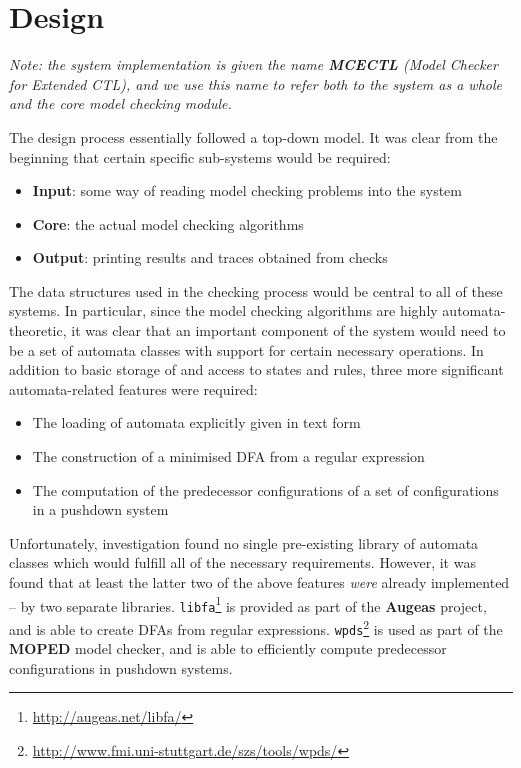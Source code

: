\documentclass[11pt]{article}
\theoremstyle{definition}
\begin{document}
\section{Design}

\textit{Note: the system implementation is given the name \textbf{MCECTL} (Model Checker for
Extended CTL), and we use this name to refer both to the system as a whole and
the core model checking module.}

The design process essentially followed a top-down model. It was clear from the beginning that certain specific sub-systems would be required:
\begin{itemize}
\item{\textbf{Input}: some way of reading model checking problems into the system}
\item{\textbf{Core}:  the actual model checking algorithms}
\item{\textbf{Output}: printing results and traces obtained from checks}
\end{itemize}

The data structures used in the checking process would be central to all of
these systems.  In particular, since the model checking algorithms are highly
automata-theoretic, it was clear that an important component of the system
would need to be a set of automata classes with support for certain necessary
operations. In addition to basic storage of and access to states and rules,
three more significant automata-related features were required:

\begin{itemize}
\item{The loading of automata explicitly given in text form}
\item{The construction of a minimised DFA from a regular expression}
\item{The computation of the predecessor configurations of a set of
configurations in a pushdown system}
\end{itemize}

Unfortunately, investigation found no single pre-existing library of automata
classes which would fulfill all of the necessary requirements. However, it was
found that at least the latter two of the above features \textit{were} already
implemented -- by two separate libraries.
\texttt{libfa}\footnote{\url{http://augeas.net/libfa/}} is provided as part of
the \textbf{Augeas} project, and is able to create DFAs from regular expressions.
\texttt{wpds}\footnote{\url{http://www.fmi.uni-stuttgart.de/szs/tools/wpds/}}
is used as part of the \textbf{MOPED} model checker, and is able to efficiently
compute predecessor configurations in pushdown systems.
\end{document}

